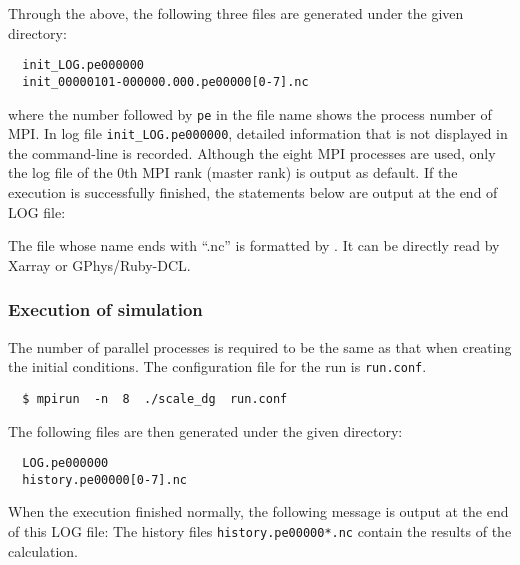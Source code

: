 
Through the above, the following three files are generated under the given directory:
\begin{verbatim}
  init_LOG.pe000000
  init_00000101-000000.000.pe00000[0-7].nc
\end{verbatim}
where 
the number followed by \verb|pe| in the file name shows the process number of MPI.
In log file \verb|init_LOG.pe000000|,
detailed information that is not displayed in the command-line is recorded.
Although the eight MPI processes are used,
only the log file of the 0th MPI rank (master rank) is output as default.
If the execution is successfully finished, 
the statements below are output at the end of LOG file:


The file whose name ends with ``.nc''  is formatted by \netcdf.
It can be directly read by Xarray or GPhys/Ruby-DCL.


\subsubsection{Execution of simulation} %

The number of parallel processes is required to be the same as that when creating the initial conditions.
The configuration file for the run is \verb|run.conf|. 

\begin{verbatim}
  $ mpirun  -n  8  ./scale_dg  run.conf
\end{verbatim}

The following files are then generated under the given directory:
\begin{verbatim}
  LOG.pe000000
  history.pe00000[0-7].nc
\end{verbatim}
When the execution finished normally,
the following message is output at the end of this LOG file:
The history files \verb|history.pe00000*.nc| contain the results of the calculation. 
